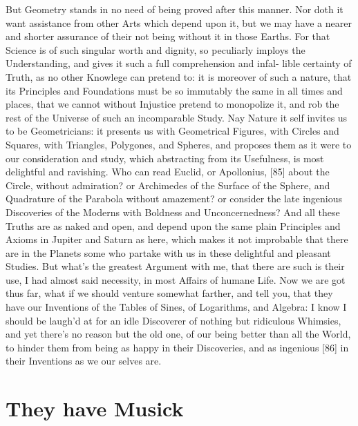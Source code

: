 \documentclass[letterpaper]{book}
\begin{document}
But Geometry stands in no need of being proved after this manner. Nor doth
it want assistance from other Arts which depend upon it, but we may have a
nearer and shorter assurance of their not being without it in those Earths.
For that Science is of such singular worth and dignity, so peculiarly
imploys the Understanding, and gives it such a full comprehension and infal-
lible certainty of Truth, as no other Knowlege can pretend to: it is
moreover of such a nature, that its Principles and Foundations must be so
immutably the same in all times and places, that we cannot without Injustice
pretend to monopolize it, and rob the rest of the Universe of such an
incomparable Study. Nay Nature it self invites us to be Geometricians: it
presents us with Geometrical Figures, with Circles and Squares, with
Triangles, Polygones, and Spheres, and proposes them as it were to our
consideration and study, which abstracting from its Usefulness, is most
delightful and ravishing. Who can read Euclid, or Apollonius, [85] about
the Circle, without admiration? or Archimedes of the Surface of the Sphere,
and Quadrature of the Parabola without amazement? or consider the late
ingenious Discoveries of the Moderns with Boldness and Unconcernedness? And
all these Truths are as naked and open, and depend upon the same plain
Principles and Axioms in Jupiter and Saturn as here, which makes it not
improbable that there are in the Planets some who partake with us in these
delightful and pleasant Studies. But what's the greatest Argument with me,
that there are such is their use, I had almost said necessity, in most
Affairs of humane Life.  Now we are got thus far, what if we should venture
somewhat farther, and tell you, that they have our Inventions of the Tables
of Sines, of Logarithms, and Algebra: I know I should be laugh'd at for an
idle Discoverer of nothing but ridiculous Whimsies, and yet there's no
reason but the old one, of our being better than all the World, to hinder
them from being as happy in their Discoveries, and as ingenious [86] in
their Inventions as we our selves are.


\section{They have Musick}
\end{document}
